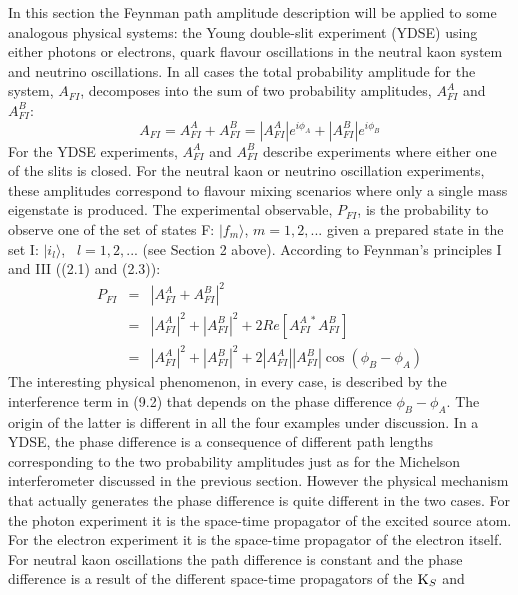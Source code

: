 { 
     In this section the Feynman path amplitude description will be applied to some analogous physical
    systems: the Young double-slit experiment (YDSE) using either photons or electrons, quark flavour
    oscillations in the neutral kaon system and neutrino oscillations. In all cases the total probability
  amplitude for the system, $A_{FI}$, decomposes into the sum of two probability amplitudes, $A_{FI}^A$
   and $A_{FI}^B$:
    \begin{equation} 
    A_{FI} = A_{FI}^A + A_{FI}^B = |A_{FI}^A|e^{i\phi_A}+|A_{FI}^B|e^{i\phi_B}
    \end{equation}
    For the YDSE experiments, $A_{FI}^A$ and $A_{FI}^B$ describe experiments where either one of the 
   slits is closed. For the neutral kaon or neutrino oscillation experiments, these amplitudes correspond to 
   flavour mixing scenarios where only a single mass eigenstate is produced.
    The experimental observable, $P_{FI}$, is the probability to observe one of the set of states F:
    $|f_m\rangle$, $m=1,2,...$ given a prepared state in the set I:  $|i_l\rangle$, \ $l=1,2,...$ (see
    Section 2 above). According to Feynman's principles I and III ((2.1) and (2.3)):
    \begin{eqnarray}
    P_{FI} & = & |A_{FI}^A+A_{FI}^B|^2  \nonumber \\
           & = & |A_{FI}^A|^2 +|A_{FI}^B|^2+2Re[A_{FI}^{A~\ast} A_{FI}^B] \nonumber \\
           & = & |A_{FI}^A|^2 +|A_{FI}^B|^2+2 |A_{FI}^A||A_{FI}^B|\cos(\phi_B-\phi_A)
     \end{eqnarray}
    The interesting physical phenomenon, in every case, is described by the interference term in (9.2) that
   depends on the phase difference $\phi_B-\phi_A$. The origin of the latter is different in all the four
  examples under discussion. In a YDSE, the phase difference is a consequence of different path lengths
   corresponding to the two probability amplitudes just as for the Michelson interferometer discussed in
   the previous section. However the physical mechanism that actually generates the phase difference is
    quite different in the two cases. For the photon experiment it is the space-time propagator of
   the excited source atom. For the electron experiment it is the  space-time propagator of
    the electron itself. For neutral kaon oscillations the path difference is constant and
 the phase difference is a result of the different space-time propagators of the ${\rm K}_S$ and 
}
